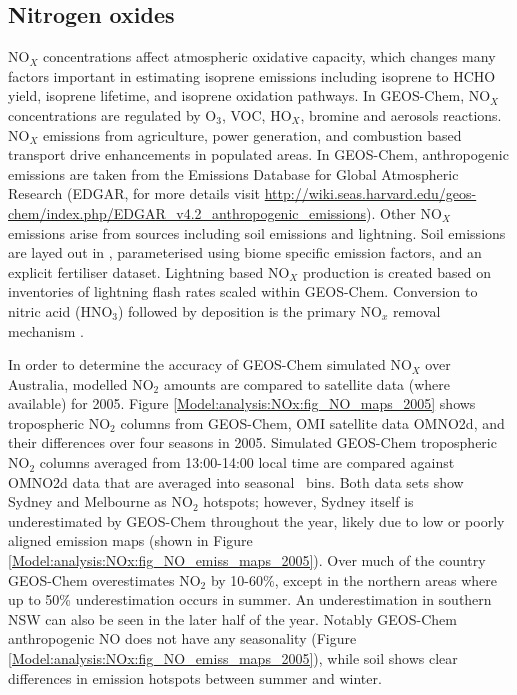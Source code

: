   \subsection{Nitrogen oxides}
    \label{Model:GC:NOx}
    NO$_X$ concentrations affect atmospheric oxidative capacity, which changes many factors important in estimating isoprene emissions including isoprene to HCHO yield, isoprene lifetime, and isoprene oxidation pathways.
    In GEOS-Chem, NO$_X$ concentrations are regulated by O$_3$, VOC, HO$_X$, bromine and aerosols reactions.
    NO$_X$ emissions from agriculture, power generation, and combustion based transport drive enhancements in populated areas.
    In GEOS-Chem, anthropogenic emissions are taken from the Emissions Database for Global Atmospheric Research (EDGAR, for more details visit \url{http://wiki.seas.harvard.edu/geos-chem/index.php/EDGAR_v4.2_anthropogenic_emissions}).
    Other NO$_X$ emissions arise from sources including soil emissions %
    and lightning.
    Soil emissions are layed out in \textcite{Hudman2012}, parameterised using biome specific emission factors, and an explicit fertiliser dataset.
    Lightning based NO$_X$ production is created based on inventories of lightning flash rates scaled within GEOS-Chem.
    Conversion to nitric acid (HNO$_3$) followed by deposition is the primary NO$_x$ removal mechanism \parencite{Delmas1997, Ayers2006}.
    
    In order to determine the accuracy of GEOS-Chem simulated NO$_X$ over Australia, modelled NO$_2$ amounts are compared to satellite data (where available) for 2005.
    Figure \ref{Model:analysis:NOx:fig_NO_maps_2005} shows tropospheric NO$_2$ columns from GEOS-Chem, OMI satellite data OMNO2d, and their differences over four seasons in 2005.
    Simulated GEOS-Chem tropospheric NO$_2$ columns averaged from 13:00-14:00 local time are compared against OMNO2d data that are averaged into seasonal \lowhr ~bins. %
    Both data sets show Sydney and Melbourne as NO$_2$ hotspots; however, Sydney itself is underestimated by GEOS-Chem throughout the year, likely due to low or poorly aligned emission maps (shown in Figure \ref{Model:analysis:NOx:fig_NO_emiss_maps_2005}).
    Over much of the country GEOS-Chem overestimates NO$_2$ by 10-60\%, except in the northern areas where up to 50\% underestimation occurs in summer.
    An underestimation in southern NSW can also be seen in the later half of the year.
    Notably GEOS-Chem anthropogenic NO does not have any seasonality (Figure \ref{Model:analysis:NOx:fig_NO_emiss_maps_2005}), while soil shows clear differences in emission hotspots between summer and winter.
    
